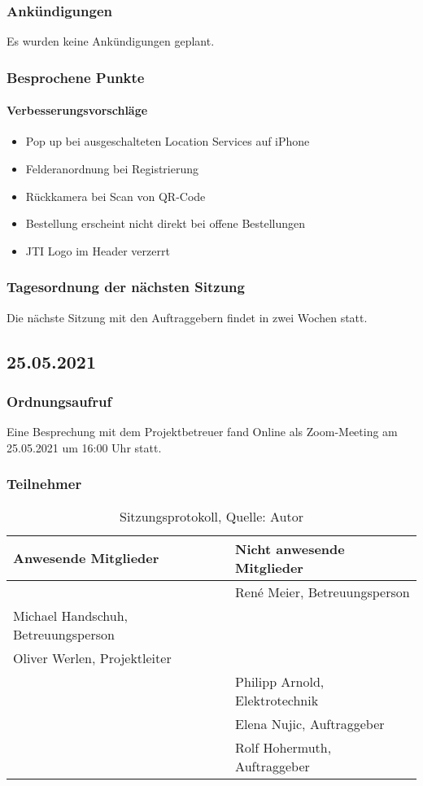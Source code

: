 \subsubsection{Ankündigungen}
Es wurden keine Ankündigungen geplant.
\subsubsection{Besprochene Punkte}
\paragraph{Verbesserungsvorschläge}
\begin{itemize}
	\item Pop up bei ausgeschalteten Location Services auf iPhone
	\item Felderanordnung bei Registrierung
	\item Rückkamera bei Scan von QR-Code
	\item Bestellung erscheint nicht direkt bei offene Bestellungen 
	\item JTI Logo im Header verzerrt
\end{itemize}
\subsubsection{Tagesordnung der nächsten Sitzung}
Die nächste Sitzung mit den Auftraggebern findet in zwei Wochen statt. 
\newpage
\subsection{25.05.2021}
\subsubsection{Ordnungsaufruf}
Eine Besprechung mit dem Projektbetreuer fand Online als Zoom-Meeting am 25.05.2021 um 16:00 Uhr statt.
\subsubsection{Teilnehmer}
\begin{table}[H]
	\setlength\extrarowheight{2pt} %
	\begin{tabularx}{\textwidth}{|X|X|}
		\hline
		\textbf{Anwesende Mitglieder} &  \textbf{Nicht anwesende Mitglieder} \\
		\hline
		& René Meier, Betreuungsperson  \\
		Michael Handschuh, Betreuungsperson &   \\
		Oliver Werlen, Projektleiter &  \\
		& Philipp Arnold, Elektrotechnik  \\
		& Elena Nujic, Auftraggeber  \\
		& Rolf Hohermuth, Auftraggeber  \\
		\hline
	\end{tabularx}
	\caption{ \label{tbl: Teilnehmerliste vom 25.05.2021}Sitzungsprotokoll, Quelle: Autor}
\end{table}
